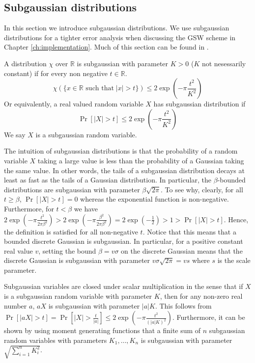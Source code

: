 \subsection*{Subgaussian distributions}
In this section we introduce subgaussian distributions. We use subgaussian distributions for a tighter error analysis when discussing the GSW scheme in Chapter \ref{ch:implementation}. Much of this section can be found in \cite{A-S-P-boot}.
\begin{definition}
    A distribution $\chi$ over $\mathbb{R}$ is subgaussian with parameter $K > 0$ ($K$ not nesessarily constant) if for every non negative $t \in \mathbb{R}$.
    \begin{equation*}
        \chi(\{x \in \mathbb{R} \text{ such that} \; |x| > t\}) \leq 2\exp \left(- \pi \frac{t^2}{K^2} \right)
    \end{equation*}
    Or equivalently, a real valued random variable $X$ has subgaussian distribution if
    \begin{equation*}
        \operatorname{Pr}[|X|>t] \leq 2\exp \left(- \pi \frac{t^2}{K^2} \right)
    \end{equation*}
    We say $X$ is a subgaussian random variable.
\end{definition}
The intuition of subgaussian distributions is that the probability of a random variable $X$ taking a large value is less than the probability of a Gaussian taking the same value. In other words, the tails of a subgaussian distribution decays at least as fast as the tails of a Gaussian distribution. In particular, the $\beta$-bounded distributions are subgaussian with parameter $\beta \sqrt{2\pi}$. To see why, clearly, for all $t \geq \beta$, $\operatorname{Pr}[|X|>t] = 0$ whereas the exponential function is non-negative. Furthermore, for $t < \beta$ we have $2\exp \left(- \pi \frac{t^2}{2\pi \beta^2} \right) > 2\exp \left(- \pi \frac{\beta^2}{2\pi \beta^2}\right) = 2\exp(-\frac{1}{2}) > 1 > \operatorname{Pr}[|X|>t]$. Hence, the definition is satisfied for all non-negative $t$. Notice that this means that a bounded discrete Gaussian is subgaussian. In particular, for a positive constant real value $v$, setting the bound $\beta = v \sigma$ on the discrete Gaussian means that the discrete Gaussian is subgaussian with parameter $v \sigma \sqrt{2\pi} = v s$ where $s$ is the scale parameter.

Subgaussian variables are closed under scalar multiplication in the sense that if $X$ is a subgaussian random variable with parameter $K$, then for any non-zero real number $a$, $aX$ is subgaussian with parameter $|a|K$. This follows from $\operatorname{Pr}[|aX|>t] = \operatorname{Pr}[|X|>\frac{t}{|a|}] \leq 2\exp\left(- \pi \frac{t^2}{(|a|K)^2}\right)$. Furthermore, it can be shown by using moment generating functions that a finite sum of $n$ subgaussian random variables with parameters $K_1, \dots, K_n$ is subgaussian with parameter $\sqrt{\sum_{i=1}^n K_i^2}$.

